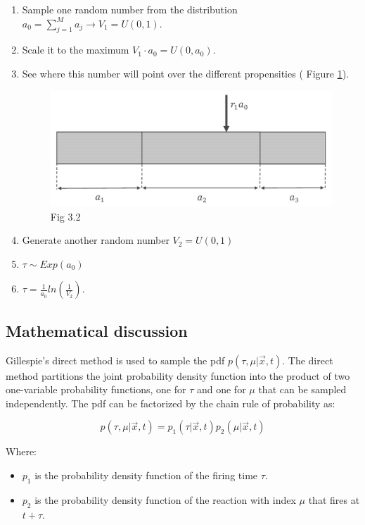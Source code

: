 \begin{enumerate}
  \item Sample one random number from the distribution $a_0 = \sum_{j=1}^{M}{a_j}\rightarrow V_1=U(0,1)$.
  \item Scale it to the maximum $V_1 \cdot a_0 =U(0,a_0)$.
  \item See where this number will point over the different propensities ( Figure \ref{fig:boundaries}).

    \begin{figure}[H]
      \centering
      \includegraphics[width=\textwidth]{boundaries.png}
      \caption{Fig 3.2}
      \label{fig:boundaries}
    \end{figure}

  \item Generate another random number $V_2 =U(0,1)$ \item $\tau \sim Exp(a_0)$ \item $\tau = \frac{1}{a_0}ln(\frac{1}{V_2})$.
\end{enumerate}

  \subsection{Mathematical discussion}
  Gillespie's direct method is used to sample the pdf $p(\tau, \mu|\vec{x},t)$.
  The direct method partitions the joint probability density function into the product of two one-variable probability functions, one for $\tau$ and one for $\mu$ that can be sampled independently.
  The pdf can be factorized by the chain rule of probability as:

  $$p(\tau, \mu|\vec{x},t) = p_1(\tau|\vec{x},t)p_2(\mu|\vec{x},t)$$

  Where:

  \begin{multicols}{2}
    \begin{itemize}
      \item $p_1$ is the probability density function of the firing time $\tau$.
      \item $p_2$ is the probability density function of the reaction with index $\mu$ that fires at $t+\tau$.
    \end{itemize}
  \end{multicols}

